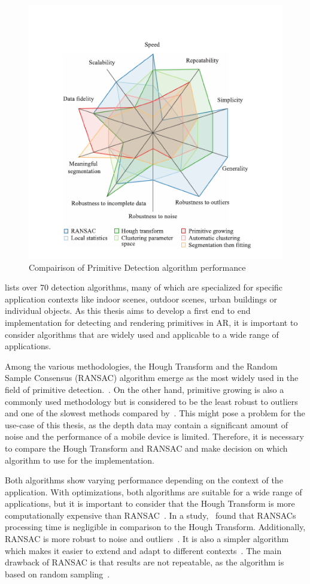 \begin{figure}[h!]
    \centering
    \includegraphics[width=0.7\linewidth]{images/algos-compairision}
    \caption{Compairison of Primitive Detection algorithm performance~\cite{kaiser_survey_2019}}
    \label{fig:}
\end{figure}


\cite{kaiser_survey_2019} lists over 70 detection algorithms, many of which are specialized for specific application contexts
like indoor scenes, outdoor scenes, urban buildings or individual objects.
As this thesis aims to develop a first end to end implementation for detecting and rendering primitives in AR,
it is important to consider algorithms that are widely used and applicable to a wide range of applications.

Among the various methodologies, the Hough Transform and the Random Sample Consensus (RANSAC) algorithm emerge as the most widely used in the field of primitive detection.~\parencite{schnabel_efficient_2007}.
On the other hand, primitive growing is also a commonly used methodology but is considered to be the least robust to outliers and one of the slowest methods compared by~\parencite{kaiser_survey_2019}.
This might pose a problem for the use-case of this thesis, as the depth data may contain a significant amount of noise and the performance of a mobile device is limited.
Therefore, it is necessary to compare the Hough Transform and RANSAC and make decision on which algorithm to use for the implementation.

Both algorithms show varying performance depending on the context of the application.
With optimizations, both algorithms are suitable for a wide range of applications, but it is important to consider
that the Hough Transform is more computationally expensive than RANSAC~\parencite{kaiser_survey_2019}.
In a study,~\cite{tarsha-kurdi_hough-transform_2007} found that RANSACs processing time is negligible in comparison to the Hough Transform.
Additionally, RANSAC is more robust to noise and outliers~\parencite{kaiser_survey_2019}.
It is also a simpler algorithm which makes it easier to extend and adapt to different contexts~\parencite{tarsha-kurdi_hough-transform_2007, kaiser_survey_2019}.
The main drawback of RANSAC is that results are not repeatable, as the algorithm is based on random sampling~\parencite{kaiser_survey_2019}.


